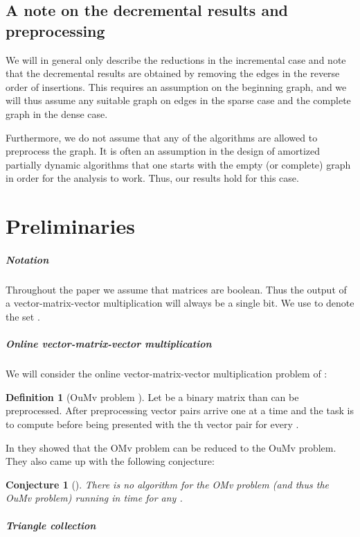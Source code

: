 \documentclass[a4paper,11pt]{article}
\newtheorem{conjecture}{Conjecture}
\theoremstyle{definition}
\newtheorem{definition}{Definition}
\begin{document}
\subsection{A note on the decremental results and preprocessing}
We will in general only describe the reductions in the incremental case and
note that the decremental results are obtained by removing the edges in the
reverse order of insertions. This requires an assumption on the beginning
graph, and we will thus assume any suitable graph on  edges in the
sparse case and the complete graph in the dense case.

Furthermore, we do not assume that any of the algorithms are allowed to
preprocess the graph. It is often an assumption in the design of amortized
partially dynamic algorithms that one starts with the empty (or complete) graph
in order for the analysis to work. Thus, our results hold for this case.


\section{Preliminaries}

\subparagraph*{Notation}
Throughout the paper we assume that matrices are boolean. Thus the output
of a vector-matrix-vector multiplication will always be a single bit. We
use  to denote the set .

\subparagraph*{Online vector-matrix-vector multiplication}

We will consider the online vector-matrix-vector multiplication problem of
\cite{HenzingerKNS15}:

\begin{definition}[OuMv problem \cite{HenzingerKNS15}]\label{defn:oumv}
    Let  be a binary  matrix than can be preprocessed. After
    preprocessing  vector pairs  arrive one at
    a time and the task is to compute  before being presented with
    the th vector pair for every .
\end{definition}

In \cite{HenzingerKNS15} they showed that the OMv problem can be reduced to the
OuMv problem. They also came up with the following conjecture:

\begin{conjecture}[\cite{HenzingerKNS15}]\label{conj:omv}
    There is no algorithm for the OMv problem (and thus the OuMv problem)
    running in time  for any .
\end{conjecture}

\subparagraph*{Triangle collection}
\end{document}
